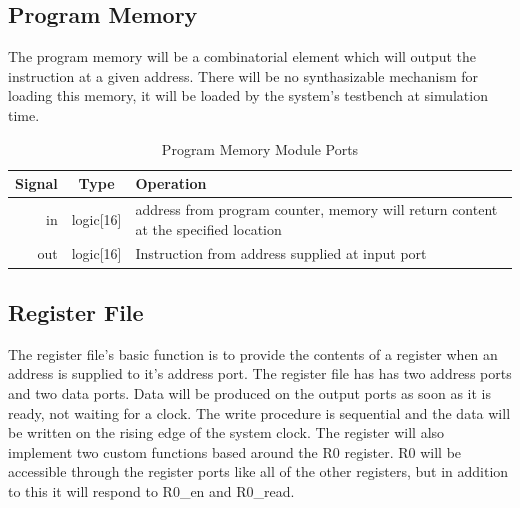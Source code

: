     \subsection{Program Memory}
    The program memory will be a combinatorial element which will output the instruction at a given address. There will be no synthasizable mechanism for loading this memory, it will be loaded by the system's testbench at simulation time.
    \begin{table}[H]
        \caption{Program Memory Module Ports}
        \label{programmemory}
        \centering
        \begin{tabular}{r c p{4.5cm}}
        Signal    &Type       & Operation\\
        \hline
        in & logic[16]& address from program counter, memory will return content at the specified location \\
        out & logic[16]& Instruction from address supplied at input port \\    
        \end{tabular}
    \end{table}

    \subsection{Register File}
    The register file's basic function is to provide the contents of a register when an address is supplied to it's address port. The register file has has two address ports and two data ports. Data will be produced on the output ports as soon as it is ready, not waiting for a clock. The write procedure is sequential and the data will be written on the rising edge of the system clock. The register will also implement two custom functions based around the R0 register. R0 will be accessible through the register ports like all of the other registers, but in addition to this it will respond to R0\_en and R0\_read.

